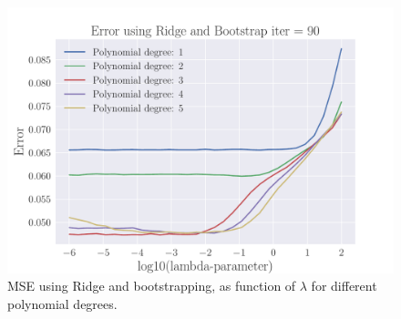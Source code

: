 \documentclass[reprint,english,notitlepage,aps,nobalancelastpage,nofootinbib]{revtex4-1}  %
\begin{document}
\begin{figure}[H]
	\includegraphics[width=\linewidth]{lambdaMSE_Ridge_Bootstrap90_n30_eps02_p5_lm6_2.pdf}
	\caption{MSE using Ridge and bootstrapping, as function of $\lambda$ for different polynomial degrees.}
	\label{fig:Ridge-boot_heatmap}
\end{figure}
\end{document}
